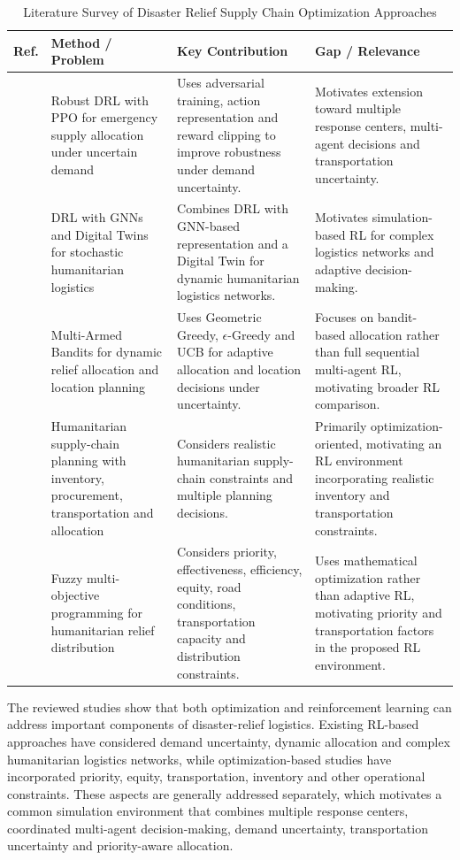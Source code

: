 \documentclass[conference]{IEEEtran}
\begin{document}
\begin{table}[htbp]
\caption{Literature Survey of Disaster Relief Supply Chain Optimization Approaches}
\label{tab:lit}
\centering
\footnotesize
\renewcommand{\arraystretch}{1.15}
\begin{tabular}{|p{0.55cm}|p{1.85cm}|p{2.1cm}|p{2.1cm}|}
\hline
\textbf{Ref.} & \textbf{Method / Problem} & \textbf{Key Contribution} & \textbf{Gap / Relevance} \\
\hline
\cite{b1} & Robust DRL with PPO for emergency supply allocation under uncertain demand & Uses adversarial training, action representation and reward clipping to improve robustness under demand uncertainty. & Motivates extension toward multiple response centers, multi-agent decisions and transportation uncertainty. \\
\hline
\cite{b2} & DRL with GNNs and Digital Twins for stochastic humanitarian logistics & Combines DRL with GNN-based representation and a Digital Twin for dynamic humanitarian logistics networks. & Motivates simulation-based RL for complex logistics networks and adaptive decision-making. \\
\hline
\cite{b3} & Multi-Armed Bandits for dynamic relief allocation and location planning & Uses Geometric Greedy, $\epsilon$-Greedy and UCB for adaptive allocation and location decisions under uncertainty. & Focuses on bandit-based allocation rather than full sequential multi-agent RL, motivating broader RL comparison. \\
\hline
\cite{b4} & Humanitarian supply-chain planning with inventory, procurement, transportation and allocation & Considers realistic humanitarian supply-chain constraints and multiple planning decisions. & Primarily optimization-oriented, motivating an RL environment incorporating realistic inventory and transportation constraints. \\
\hline
\cite{b5} & Fuzzy multi-objective programming for humanitarian relief distribution & Considers priority, effectiveness, efficiency, equity, road conditions, transportation capacity and distribution constraints. & Uses mathematical optimization rather than adaptive RL, motivating priority and transportation factors in the proposed RL environment. \\
\hline
\end{tabular}
\end{table}

The reviewed studies show that both optimization and reinforcement learning can address important components of disaster-relief logistics. Existing RL-based approaches have considered demand uncertainty, dynamic allocation and complex humanitarian logistics networks, while optimization-based studies have incorporated priority, equity, transportation, inventory and other operational constraints. These aspects are generally addressed separately, which motivates a common simulation environment that combines multiple response centers, coordinated multi-agent decision-making, demand uncertainty, transportation uncertainty and priority-aware allocation.
\end{document}
